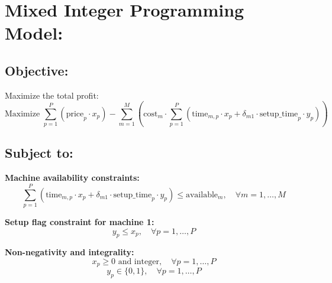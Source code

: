 \documentclass{article}
\begin{document}
\section*{Mixed Integer Programming Model:}

\subsection*{Objective:}
Maximize the total profit:
\[
\text{Maximize } \sum_{p=1}^{P} \left( \text{price}_{p} \cdot x_p \right) - \sum_{m=1}^{M} \left( \text{cost}_{m} \cdot \sum_{p=1}^{P} \left( \text{time}_{m,p} \cdot x_p + \delta_{m1} \cdot \text{setup\_time}_{p} \cdot y_p \right) \right)
\]

\subsection*{Subject to:}

\textbf{Machine availability constraints:}
\[
\sum_{p=1}^{P} \left( \text{time}_{m,p} \cdot x_p + \delta_{m1} \cdot \text{setup\_time}_{p} \cdot y_p \right) \leq \text{available}_{m}, \quad \forall m = 1, \ldots, M
\]

\textbf{Setup flag constraint for machine 1:}
\[
y_p \leq x_p, \quad \forall p = 1, \ldots, P
\]

\textbf{Non-negativity and integrality:}
\[
x_p \geq 0 \text{ and integer}, \quad \forall p = 1, \ldots, P
\]
\[
y_p \in \{0, 1\}, \quad \forall p = 1, \ldots, P
\]
\end{document}
